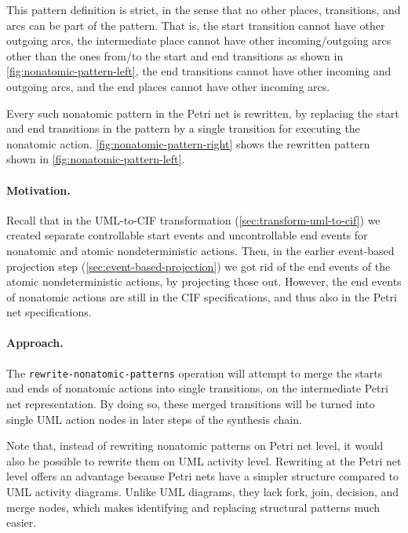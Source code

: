 \documentclass{article}
\newcommand{\keyw}[1]{\texttt{#1}}
\newcommand{\rewriteNonAtomicPatternsLabel}[0]{\keyw{rewrite-nonatomic-patterns}}
\theoremstyle{definition}
\begin{document}
This pattern definition is strict, in the sense that no other places, transitions, and arcs can be part of the pattern.
That is, the start transition cannot have other outgoing arcs, the intermediate place cannot have other incoming/outgoing arcs other than the ones from/to the start and end transitions as shown in \autoref{fig:nonatomic-pattern-left}, the end transitions cannot have other incoming and outgoing arcs, and the end places cannot have other incoming arcs.

Every such nonatomic pattern in the Petri net is rewritten, by replacing the start and end transitions in the pattern by a single transition for executing the nonatomic action.
\autoref{fig:nonatomic-pattern-right} shows the rewritten pattern shown in \autoref{fig:nonatomic-pattern-left}.

\paragraph{Motivation.}
Recall that in the UML-to-CIF transformation (\autoref{sec:transform-uml-to-cif}) we created separate controllable start events and uncontrollable end events for nonatomic and atomic nondeterministic actions.
Then, in the earlier event-based projection step (\autoref{sec:event-based-projection}) we got rid of the end events of the atomic nondeterministic actions, by projecting those out.
However, the end events of nonatomic actions are still in the CIF specifications, and thus also in the Petri net specifications.

\paragraph{Approach.}
The \rewriteNonAtomicPatternsLabel{} operation will attempt to merge the starts and ends of nonatomic actions into single transitions, on the intermediate Petri net representation.
By doing so, these merged transitions will be turned into single UML action nodes in later steps of the synthesis chain.

Note that, instead of rewriting nonatomic patterns on Petri net level, it would also be possible to rewrite them on UML activity level.
Rewriting at the Petri net level offers an advantage because Petri nets have a simpler structure compared to UML activity diagrams. Unlike UML diagrams, they lack fork, join, decision, and merge nodes, which makes identifying and replacing structural patterns much easier.
\end{document}
